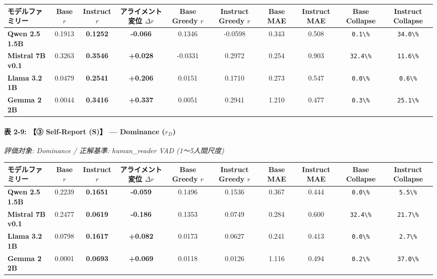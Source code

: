 \begin{center}
\small
\begin{tabular}{lccccccccc}
\toprule
\textbf{モデルファミリー} & \textbf{Base $r$} & \textbf{Instruct $r$} & \textbf{アライメント変位 $\Delta r$} & \textbf{Base Greedy $r$} & \textbf{Instruct Greedy $r$} & \textbf{Base MAE} & \textbf{Instruct MAE} & \textbf{Base Collapse} & \textbf{Instruct Collapse} \\
\midrule
\textbf{Qwen 2.5 1.5B} & 0.1913 & \textbf{0.1252} & \textbf{-0.066} & 0.1346 & -0.0598 & 0.343 & 0.508 & \texttt{0.1\textbackslash{}\%} & \texttt{34.0\textbackslash{}\%} \\
\textbf{Mistral 7B v0.1} & 0.3263 & \textbf{0.3546} & \textbf{+0.028} & -0.0331 & 0.2972 & 0.254 & 0.903 & \texttt{32.4\textbackslash{}\%} & \texttt{11.6\textbackslash{}\%} \\
\textbf{Llama 3.2 1B} & 0.0479 & \textbf{0.2541} & \textbf{+0.206} & 0.0151 & 0.1710 & 0.273 & 0.547 & \texttt{0.0\textbackslash{}\%} & \texttt{0.6\textbackslash{}\%} \\
\textbf{Gemma 2 2B} & 0.0044 & \textbf{0.3416} & \textbf{+0.337} & 0.0051 & 0.2941 & 1.210 & 0.477 & \texttt{0.3\textbackslash{}\%} & \texttt{25.1\textbackslash{}\%} \\
\bottomrule
\end{tabular}
\end{center}


\paragraph{表 2-9: 【③ Self-Report (S)】 — Dominance ($r_D$)}
\textit{評価対象: Dominance / 正解基準: human\_reader VAD (1〜5人間尺度)}

\begin{center}
\small
\begin{tabular}{lccccccccc}
\toprule
\textbf{モデルファミリー} & \textbf{Base $r$} & \textbf{Instruct $r$} & \textbf{アライメント変位 $\Delta r$} & \textbf{Base Greedy $r$} & \textbf{Instruct Greedy $r$} & \textbf{Base MAE} & \textbf{Instruct MAE} & \textbf{Base Collapse} & \textbf{Instruct Collapse} \\
\midrule
\textbf{Qwen 2.5 1.5B} & 0.2239 & \textbf{0.1651} & \textbf{-0.059} & 0.1496 & 0.1536 & 0.367 & 0.444 & \texttt{0.0\textbackslash{}\%} & \texttt{5.5\textbackslash{}\%} \\
\textbf{Mistral 7B v0.1} & 0.2477 & \textbf{0.0619} & \textbf{-0.186} & 0.1353 & 0.0749 & 0.284 & 0.600 & \texttt{32.4\textbackslash{}\%} & \texttt{21.7\textbackslash{}\%} \\
\textbf{Llama 3.2 1B} & 0.0798 & \textbf{0.1617} & \textbf{+0.082} & 0.0173 & 0.0627 & 0.241 & 0.413 & \texttt{0.0\textbackslash{}\%} & \texttt{2.7\textbackslash{}\%} \\
\textbf{Gemma 2 2B} & 0.0001 & \textbf{0.0693} & \textbf{+0.069} & 0.0118 & 0.0126 & 1.116 & 0.494 & \texttt{0.2\textbackslash{}\%} & \texttt{37.0\textbackslash{}\%} \\
\bottomrule
\end{tabular}
\end{center}


